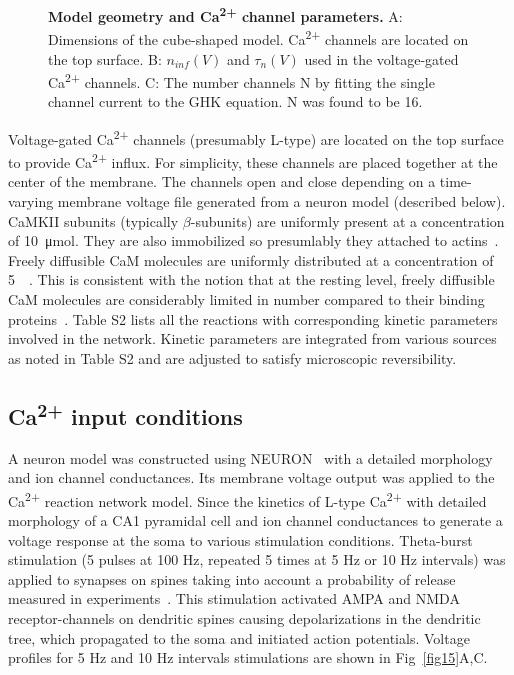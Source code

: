 \documentclass[10pt,letterpaper]{article}
\begin{document}
\begin{figure}[!h]
	\caption{{\bf Model geometry and Ca\textsuperscript{2+} channel parameters.}
	A: Dimensions of the cube-shaped model. Ca\textsuperscript{2+} channels are located on the top surface. 
	B: $n_{inf}(V)$ and $\tau_n(V)$ used in the voltage-gated Ca\textsuperscript{2+} channels.
	C: The number channels N by fitting the single channel current to the GHK equation. N was found to be 16. 
	}
\label{fig14}
\end{figure}

Voltage-gated Ca\textsuperscript{2+} channels (presumably L-type) are located on the top surface to provide Ca\textsuperscript{2+} influx. For simplicity, these channels are placed together at the center of the membrane. The channels open and close depending on a time-varying membrane voltage file generated from a neuron model (described below). CaMKII subunits (typically $\beta$-subunits) are uniformly present at a concentration of \SI{10}{\umol}. They are also immobilized so presumlably they attached to actins~\cite{Li:2016cq}. Freely diffusible CaM molecules are uniformly distributed at a concentration of \SI{5}{\micro\Molar}. This is consistent with the notion that at the resting level, freely diffusible CaM molecules are considerably limited in number compared to their binding proteins~\cite{Tran:2003fs,2008BpJ....95.6002S,LubyPhelps:1995kl}. Table S2 lists all the reactions with corresponding kinetic parameters involved in the network. Kinetic parameters are integrated from various sources as noted in Table S2 and are adjusted to satisfy microscopic reversibility. 

\subsection*{Ca\textsuperscript{2+} input conditions}

A neuron model was constructed using NEURON~\cite{Carnevale:2006iv} with a detailed morphology and ion channel conductances. Its membrane voltage output was applied to the Ca\textsuperscript{2+} reaction network model. Since the kinetics of L-type Ca\textsuperscript{2+} with detailed morphology of a CA1 pyramidal cell and ion channel conductances to generate a voltage response at the soma to various stimulation conditions. Theta-burst stimulation (5 pulses at 100 Hz, repeated 5 times at 5 Hz or 10 Hz intervals) was applied to synapses on spines taking into account a probability of release measured in experiments~\cite{Grover:2009hb}. This stimulation activated AMPA and NMDA receptor-channels on dendritic spines causing depolarizations in the dendritic tree, which propagated to the soma and initiated action potentials. Voltage profiles for 5 Hz and 10 Hz intervals stimulations are shown in Fig~\ref{fig15}A,C. 
\end{document}

